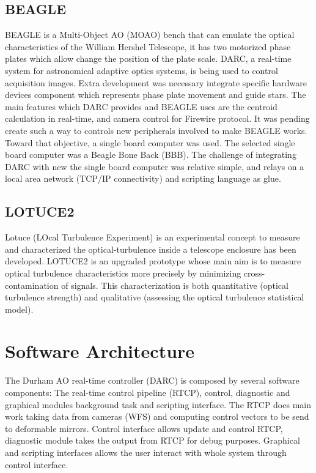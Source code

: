 \documentclass[]{spie}  %
\begin{document}
\subsection{BEAGLE}
BEAGLE is a Multi-Object AO (MOAO) bench that can emulate the optical
characteristics of the William Hershel Telescope, it has two motorized phase
plates which allow change the position of the plate scale. DARC, a real-time
system for astronomical adaptive optics systems, is being used to control
acquisition images. Extra development was necessary integrate specific hardware
devices component which represents phase plate movement and guide stars. The
main features which DARC provides and BEAGLE uses are the centroid calculation
in real-time\cite{basden2012wavefront}, and camera control for Firewire
protocol. It was pending create such a way to controls new peripherals involved
to make BEAGLE works. Toward that objective, a single board computer was used.
The selected single board computer was a Beagle Bone Back (BBB). The challenge
of integrating DARC with new the single board computer was relative simple, and
relays on a local area network (TCP/IP connectivity) and scripting language
as glue. 


\subsection{LOTUCE2}
Lotuce (LOcal Turbulence Experiment)\cite{ziad1a2013lotuce} is an experimental
concept to measure and characterized the optical-turbulence inside a telescope
enclosure has been developed\cite{berdja1afirst}. LOTUCE2 is an upgraded
prototype whose main aim is to measure optical turbulence characteristics more
precisely by minimizing cross-contamination of signals. This characterization
is both quantitative (optical turbulence strength) and qualitative (assessing
        the optical turbulence statistical model). 


\section{Software Architecture}\label{sec:SWA} 
The Durham AO real-time controller (DARC) is composed by several software
components: The real-time control pipeline (RTCP), control, diagnostic and
graphical modules background task and scripting interface. The RTCP does main
work taking data from cameras (WFS) and computing control vectors to be send to
deformable mirrors. Control interface allows update and control RTCP, diagnostic 
module takes the output from RTCP for debug purposes.  Graphical and scripting
interfaces allows the user interact with whole system through control
interface\cite{basden2010durham}.
\end{document}
